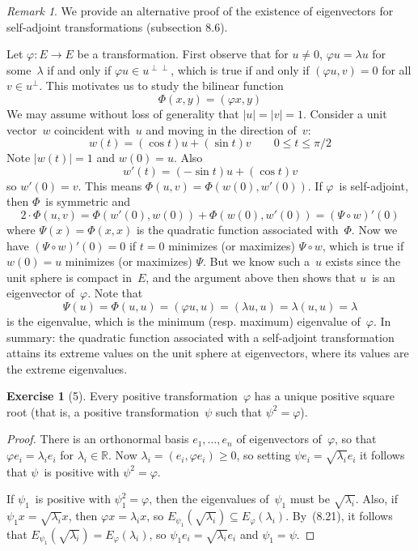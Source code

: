 \documentclass[letterpaper,12pt]{article}
\newcommand{\R}{\mathbb{R}}
\newcommand{\after}{\circ}
\newcommand{\mult}{\cdot}
\newcommand{\oc}[1]{#1^{\perp}}
\newcommand{\occ}[1]{#1^{\perp\perp}}
\newcommand{\iprod}[2]{(#1,#2)}
\newcommand{\norm}[1]{|#1|}
\theoremstyle{definition}
\newtheorem*{exer}{Exercise}
\theoremstyle{remark}
\newtheorem*{rmk}{Remark}
\begin{document}
\begin{rmk}
We provide an alternative proof of the existence of eigenvectors for self-adjoint transformations (subsection 8.6).

Let \(\varphi:E\to E\) be a transformation. First observe that for \(u\ne 0\), \(\varphi u=\lambda u\) for some~\(\lambda\) if and only if \(\varphi u\in\occ{u}\), which is true if and only if \(\iprod{\varphi u}{v}=0\) for all \(v\in\oc{u}\). This motivates us to study the bilinear function
\[\Phi(x,y)=\iprod{\varphi x}{y}\]
We may assume without loss of generality that \(\norm{u}=\norm{v}=1\). Consider a unit vector~\(w\) coincident with~\(u\) and moving in the direction of~\(v\):
\[w(t)=(\cos t)u+(\sin t)v\qquad 0\le t\le\pi/2\]
Note \(\norm{w(t)}=1\) and \(w(0)=u\). Also
\[w'(t)=(-\sin t)u+(\cos t)v\]
so \(w'(0)=v\). This means \(\Phi(u,v)=\Phi(w(0),w'(0))\). If \(\varphi\)~is self-adjoint, then \(\Phi\)~is symmetric and
\[2\mult\Phi(u,v)=\Phi(w'(0),w(0))+\Phi(w(0),w'(0))=(\Psi\after w)'(0)\]
where \(\Psi(x)=\Phi(x,x)\) is the quadratic function associated with~\(\Phi\). Now we have \((\Psi\after w)'(0)=0\) if \(t=0\) minimizes (or maximizes) \(\Psi\after w\), which is true if \(w(0)=u\) minimizes (or maximizes) \(\Psi\). But we know such a~\(u\) exists since the unit sphere is compact in~\(E\), and the argument above then shows that \(u\)~is an eigenvector of~\(\varphi\). Note that
\[\Psi(u)=\Phi(u,u)=\iprod{\varphi u}{u}=\iprod{\lambda u}{u}=\lambda\iprod{u}{u}=\lambda\]
is the eigenvalue, which is the minimum (resp. maximum) eigenvalue of~\(\varphi\). In summary: the quadratic function associated with a self-adjoint transformation attains its extreme values on the unit sphere at eigenvectors, where its values are the extreme eigenvalues.
\end{rmk}

\begin{exer}[5]
Every positive transformation~\(\varphi\) has a unique positive square root (that is, a positive transformation~\(\psi\) such that \(\psi^2=\varphi\)).
\end{exer}
\begin{proof}
There is an orthonormal basis \(e_1,\ldots,e_n\) of eigenvectors of~\(\varphi\), so that \(\varphi e_i=\lambda_i e_i\) for \(\lambda_i\in\R\). Now \(\lambda_i=\iprod{e_i}{\varphi e_i}\ge 0\), so setting \(\psi e_i=\sqrt{\lambda_i}e_i\) it follows that \(\psi\)~is positive with \(\psi^2=\varphi\).

If \(\psi_1\)~is positive with \(\psi_1^2=\varphi\), then the eigenvalues of~\(\psi_1\) must be \(\sqrt{\lambda_i}\). Also, if \(\psi_1x=\sqrt{\lambda_i}x\), then \(\varphi x=\lambda_i x\), so \(E_{\psi_1}(\sqrt{\lambda_i})\subseteq E_{\varphi}(\lambda_i)\). By~(8.21), it follows that \(E_{\psi_1}(\sqrt{\lambda_i})=E_{\varphi}(\lambda_i)\), so \(\psi_1 e_i=\sqrt{\lambda_i}e_i\) and \(\psi_1=\psi\).
\end{proof}
\end{document}
